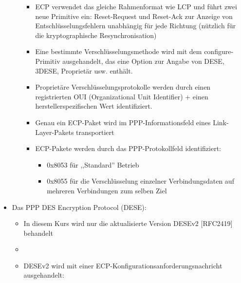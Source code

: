 \documentclass[a4paper]{article}
\begin{document}
\begin{multicols}{3}
\begin{itemize}
\begin{itemize}
                        \begin{itemize}
                            \item
                                  ECP verwendet das gleiche Rahmenformat wie LCP und führt zwei neue
                                  Primitive ein: Reset-Request und Reset-Ack zur Anzeige von
                                  Entschlüsselungsfehlern unabhängig für jede Richtung (nützlich für
                                  die kryptographische Resynchronisation)
                            \item
                                  Eine bestimmte Verschlüsselungsmethode wird mit dem
                                  configure-Primitiv ausgehandelt, das eine Option zur Angabe von
                                  DESE, 3DESE, Proprietär usw. enthält.
                            \item
                                  Proprietäre Verschlüsselungsprotokolle werden durch einen
                                  registrierten OUI (Organizational Unit Identifier) + einen
                                  herstellerspezifischen Wert identifiziert.
                            \item
                                  Genau ein ECP-Paket wird im PPP-Informationsfeld eines
                                  Link-Layer-Pakets transportiert
                            \item
                                  ECP-Pakete werden durch das PPP-Protokollfeld identifiziert:

                                  \begin{itemize}
                                      \item
                                            0x8053 für ,,Standard'' Betrieb
                                      \item
                                            0x8055 für die Verschlüsselung einzelner Verbindungsdaten auf
                                            mehreren Verbindungen zum selben Ziel
                                  \end{itemize}
                        \end{itemize}
              \end{itemize}
        \item
              Das PPP DES Encryption Protocol (DESE):

              \begin{itemize}
                  \item
                        In diesem Kurs wird nur die aktualisierte Version DESEv2
                        {[}RFC2419{]} behandelt
                  \item
                  \item
                        DESEv2 wird mit einer ECP-Konfigurationsanforderungsnachricht
                        ausgehandelt:


\end{itemize}
\end{itemize}
\end{multicols}
\end{document}
